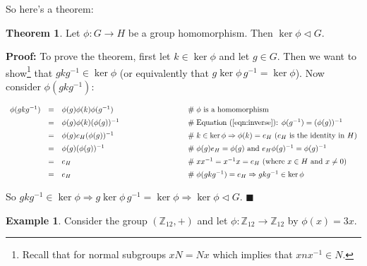 \documentclass{article}
\theoremstyle{definition}
\newtheorem{theorem}{Theorem}[section]
\newtheorem{example}{Example}[section]
\begin{document}
\medskip
\noindent
So here's a theorem:

\medskip
\begin{theorem}
	Let $\phi: G \rightarrow H$ be a  group
	homomorphism. Then $\ker \phi  \lhd  G$.
\label{theorem:kernel_is_a_normal_subgroup}
\end{theorem} 


\medskip
\noindent
{\bf Proof: }To prove the theorem, first let $k \in \ker \phi$ 
and let $g \in G$. Then we want to show\footnote{Recall that for 
normal subgroups $xN = Nx$ which implies that $xnx^{-1} \in N$.}  
that $gkg^{-1} \in \ker \phi$ (or equivalently that 
$g \ker \phi \, g^{-1} = \ker \phi$). Now consider $\phi(gkg^{-1})$:

\begin{equation*}
\begin{array}{rcll}
\phi(gkg^{-1})
&=& \phi(g)\phi(k)\phi(g^{-1})
                &\hspace{8em} \mathrel{\#} \text{$\phi$ is a homomorphism} \\
[5pt]
&=& \phi(g)\phi(k)(\phi(g))^{-1}
                &\hspace{8em} \mathrel{\#} \text{Equation (\ref{eqn:inverse}): }\phi(g^{-1}) = (\phi(g))^{-1} \\
[5pt]
&=& \phi(g) e_H (\phi(g))^{-1}
                &\hspace{8em} \mathrel{\#} k \in \ker \phi \Rightarrow \phi(k) = e_H  
                				\text{ ($e_H$ is the identity in $H$)} \\
[5pt]
&=& \phi(g) (\phi(g))^{-1}
                &\hspace{8em} \mathrel{\#} \phi(g) e_H = \phi(g) \text{ and } 
                				e_H \phi(g)^{-1} = \phi(g)^{-1} \\
[5pt]
&=& e_H
                &\hspace{8em} \mathrel{\#} xx^{-1} = x^{-1} x = e_H 
                				\text{ (where $x \in H$ and $x \neq 0$)} \\
[5pt]
&=& e_H
                &\hspace{8em} \mathrel{\#} \phi(gkg^{-1}) = e_H \Rightarrow 
                				gkg^{-1} \in \ker \phi
\end{array}
\end{equation*}


\noindent
So $gkg^{-1} \in \ker \phi \Rightarrow g \ker \phi \, g^{-1} =
\ker \phi \Rightarrow \ker \phi \lhd G$. $\blacksquare$


\medskip
\noindent
\begin{example}
Consider the group $(\mathbb{Z}_{12},+)$ and
let $\phi: \mathbb{Z}_{12} \rightarrow \mathbb{Z}_{12}$ by
$\phi(x) = 3x$.
\end{example}
\end{document}
